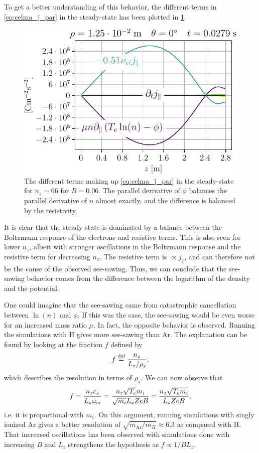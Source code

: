 \noindent
To get a better understanding of this behavior, the different terms in \cref{eq:celma_j_par} in the steady-state has been plotted in \cref{fig:jParBalance}.
%
\begin{figure}[htb]
    \centering
    \includegraphics{fig/results/jParBalanceNy66}
    \caption{The different terms making up \cref{eq:celma_j_par} in the steady-state for $n_z=66$ for $B=0.06$.
        The parallel derivative of $\phi$ balances the parallel derivative of $n$ almost exactly, and the difference is balanced by the resistivity.
    }
    \label{fig:jParBalance}
\end{figure}
%
It is clear that the steady state is dominated by a balance between the Boltzmann response of the electrons and resistive terms.
This is also seen for lower $n_z$, albeit with stronger oscillations in the Boltzmann response and the resistive term for decreasing $n_z$.
The resistive term is $\propto j_\|$, and can therefore not be the cause of the observed see-sawing.
Thus, we can conclude that the see-sawing behavior comes from the difference between the logarithm of the density and the potential.

One could imagine that the see-sawing came from catastrophic cancellation between $\ln(n)$ and $\phi$.
If this was the case, the see-sawing would be even worse for an increased mass ratio $\mu$.
In fact, the opposite behavior is observed.
Running the simulations with $\text{H}$ gives more see-sawing than $\text{Ar}$.
The explanation can be found by looking at the fraction $f$ defined by
%
\begin{align}
    f \overset{\text{def}}{=} \frac{n_z}{L_z/\rho_s},
    \label{eq:defF}
\end{align}
%
which describes the resolution in terms of $\rho_s$.
We can now observe that
%
\begin{align*}
  f = \frac{n_zc_s}{L_z \omega_{ci}}
    = \frac{n_z\sqrt{T_e}m_i}{\sqrt{m_i} L_z ZeB}
    = \frac{n_z\sqrt{T_em_i}}{L_z ZeB},
\end{align*}
%
i.e. it is proportional with $m_i$.
On this argument, running simulations with singly ionized $\text{Ar}$ gives a better resolution of $\sqrt{m_{\text{Ar}}/m_H}\approx6.3$ as compared with $\text{H}$.
That increased oscillations has been observed with simulations done with increasing $B$ and $L_z$ strengthens the hypothesis as $f\propto 1/BL_z$.

